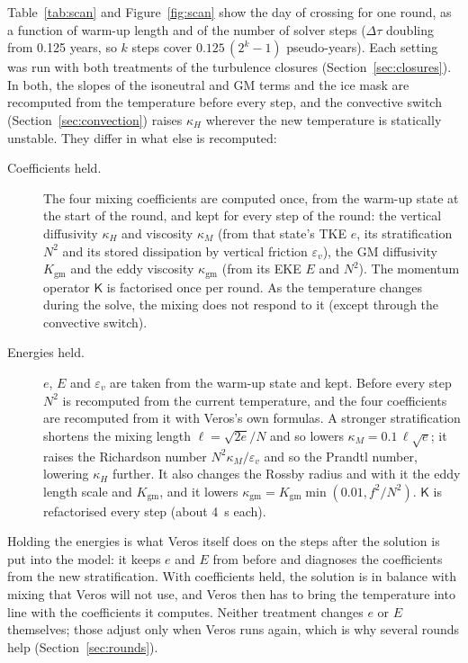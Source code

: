 \documentclass{article}
\begin{document}
Table~\ref{tab:scan} and Figure~\ref{fig:scan} show the day of crossing for one round, as a function of warm-up length and of the number of solver steps ($\Delta\tau$ doubling from 0.125 years, so $k$ steps cover $0.125\,(2^k-1)$ pseudo-years).
Each setting was run with both treatments of the turbulence closures (Section~\ref{sec:closures}). In both, the slopes of the isoneutral and GM terms and the ice mask are recomputed from the temperature before every step, and the convective switch (Section~\ref{sec:convection}) raises $\kappa_H$ wherever the new temperature is statically unstable. They differ in what else is recomputed:
\begin{description}
\item[Coefficients held.] The four mixing coefficients are computed once, from the warm-up state at the start of the round, and kept for every step of the round: the vertical diffusivity $\kappa_H$ and viscosity $\kappa_M$ (from that state's TKE $e$, its stratification $N^2$ and its stored dissipation by vertical friction $\varepsilon_v$), the GM diffusivity $K_\text{gm}$ and the eddy viscosity $\kappa_\text{gm}$ (from its EKE $E$ and $N^2$). The momentum operator $\mathsf{K}$ is factorised once per round. As the temperature changes during the solve, the mixing does not respond to it (except through the convective switch).
\item[Energies held.] $e$, $E$ and $\varepsilon_v$ are taken from the warm-up state and kept. Before every step $N^2$ is recomputed from the current temperature, and the four coefficients are recomputed from it with Veros's own formulas. A stronger stratification shortens the mixing length $\ell=\sqrt{2e}/N$ and so lowers $\kappa_M = 0.1\,\ell\sqrt{e}$; it raises the Richardson number $N^2\kappa_M/\varepsilon_v$ and so the Prandtl number, lowering $\kappa_H$ further. It also changes the Rossby radius and with it the eddy length scale and $K_\text{gm}$, and it lowers $\kappa_\text{gm} = K_\text{gm}\min(0.01, f^2/N^2)$. $\mathsf{K}$ is refactorised every step (about 4~s each).
\end{description}
Holding the energies is what Veros itself does on the steps after the solution is put into the model: it keeps $e$ and $E$ from before and diagnoses the coefficients from the new stratification. With coefficients held, the solution is in balance with mixing that Veros will not use, and Veros then has to bring the temperature into line with the coefficients it computes. Neither treatment changes $e$ or $E$ themselves; those adjust only when Veros runs again, which is why several rounds help (Section~\ref{sec:rounds}).
\end{document}
